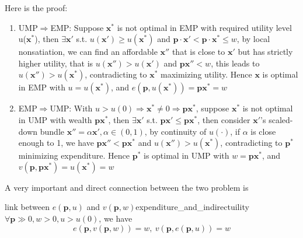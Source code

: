Here is the proof:
\begin{enumerate}
    \item UMP$\Rightarrow$EMP: Suppose $\mathbf{x}^*$ is not optimal in EMP with required utility level u($\mathbf{x}^*$), then $\exists \mathbf{x}'$ s.t. $u(\mathbf{x}')\geq u(\mathbf{x}^*)$ and $\mathbf{p}\cdot\mathbf{x}'<\mathbf{p}\cdot\mathbf{x}^*\leq w$, by local nonsatiation, we can find an affordable $\mathbf{x}''$ that is close to $\mathbf{x}'$ but has strictly higher utility, that is $u(\mathbf{x}'')>u(\mathbf{x}')$ and $\mathbf{p}\mathbf{x}''< w$, this leads to $u(\mathbf{x}'')>u(\mathbf{x}^*)$, contradicting to $\mathbf{x}^*$ maximizing utility. Hence $\mathbf{x}$ is optimal in EMP with $u=u(\mathbf{x}^*)$, and $e(\mathbf{p},u(\mathbf{x}^*))=\mathbf{p}\mathbf{x}^*=w$
    \item EMP$\Rightarrow$UMP: With $u>u(0)\Rightarrow \mathbf{x}^*\neq 0\Rightarrow \mathbf{p}\mathbf{x}^*$, suppose $\mathbf{x}^*$ is not optimal in UMP with wealth $\mathbf{p}\mathbf{x}^*$, then $\exists \mathbf{x}'$ s.t. $\mathbf{p}\mathbf{x}'\leq \mathbf{p}\mathbf{x}^*$, then consider $\mathbf{x}'$'s scaled-down bundle $\mathbf{x}''=\alpha \mathbf{x}',\alpha\in(0,1)$, by continuity of $u(\cdot)$, if $\alpha$ is close enough to 1, we have $\mathbf{p}\mathbf{x}''<\mathbf{p}\mathbf{x}^*$ and $u(\mathbf{x}'')>u(\mathbf{x}^*)$, contradicting to $\mathbf{p}^*$ minimizing expenditure. Hence $\mathbf{p}^*$ is optimal in UMP with $w=\mathbf{p}\mathbf{x}^*$, and $v(\mathbf{p},\mathbf{p}\mathbf{x}^*)=u(\mathbf{x}^*)=w$
\end{enumerate}

A very important and direct connection between the two problem is 
\begin{proposition}{link between $e(\mathbf{p},u)$ and $v(\mathbf{p},w)$}{expenditure_and_indirectuility}
    $\forall \mathbf{p}\gg 0,w>0,u>u(0)$, we have $$e(\mathbf{p},v(\mathbf{p},w))=w,\ v(\mathbf{p},e(\mathbf{p},u))=w$$
\end{proposition}


